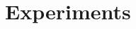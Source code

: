 \documentclass{article}
\theoremstyle{plain}
\theoremstyle{definition}
\theoremstyle{remark}
\begin{document}
\section{Experiments}
\end{document}
